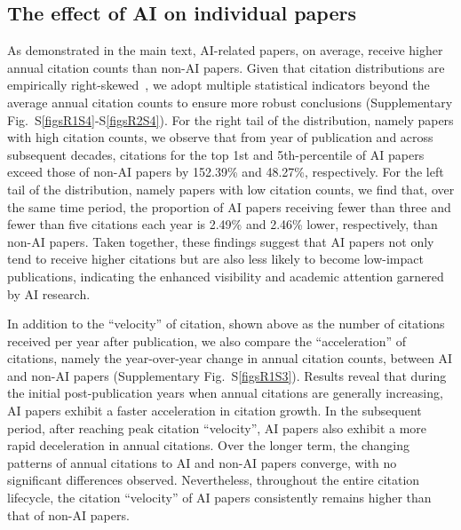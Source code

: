 \subsection{The effect of AI on individual papers}
\label{The effect of AI on individual papers}
As demonstrated in the main text, AI-related papers, on average, receive higher annual citation counts than non-AI papers.
Given that citation distributions are empirically right-skewed~\supercite{redner1998popular,seglen1992skewness}, we adopt multiple statistical indicators beyond the average annual citation counts to ensure more robust conclusions (Supplementary Fig.~S\ref{figsR1S4}-S\ref{figsR2S4}).
For the right tail of the distribution, namely papers with high citation counts, we observe that from year of publication and across subsequent decades, citations for the top 1st and 5th-percentile of AI papers exceed those of non-AI papers by 152.39\% and 48.27\%, respectively.
For the left tail of the distribution, namely papers with low citation counts, we find that, over the same time period, the proportion of AI papers receiving fewer than three and fewer than five citations each year is 2.49\% and 2.46\% lower, respectively, than non-AI papers.
Taken together, these findings suggest that AI papers not only tend to receive higher citations but are also less likely to become low-impact publications, indicating the enhanced visibility and academic attention garnered by AI research.

In addition to the “velocity” of citation, shown above as the number of citations received per year after publication, we also compare the “acceleration” of citations, namely the year-over-year change in annual citation counts, between AI and non-AI papers (Supplementary Fig.~S\ref{figsR1S3}).
Results reveal that during the initial post-publication years when annual citations are generally increasing, AI papers exhibit a faster acceleration in citation growth.
In the subsequent period, after reaching peak citation “velocity”, AI papers also exhibit a more rapid deceleration in annual citations. Over the longer term, the changing patterns of annual citations to AI and non-AI papers converge, with no significant differences observed.
Nevertheless, throughout the entire citation lifecycle, the citation “velocity” of AI papers consistently remains higher than that of non-AI papers.

